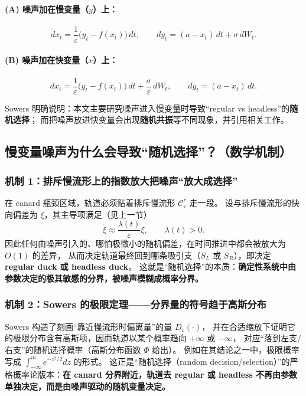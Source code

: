 \documentclass[a4paper,twoside,openany,UTF8]{article}  %
\numberwithin{equation}{section}  %
\numberwithin{equation}{section}  %
\begin{document}
\paragraph{(A) 噪声加在慢变量（$y$）上：}
\begin{equation}\label{eq:slow-noise}
	dx_t=\frac{1}{\varepsilon}\bigl(y_t-f(x_t)\bigr)\,dt,\qquad
	dy_t=(a-x_t)\,dt+\sigma\,dW_t .
\end{equation}

\paragraph{(B) 噪声加在快变量（$x$）上：}
\begin{equation}\label{eq:fast-noise}
	dx_t=\frac{1}{\varepsilon}\bigl(y_t-f(x_t)\bigr)\,dt+\frac{\sigma}{\varepsilon}\,dW_t,\qquad
	dy_t=(a-x_t)\,dt .
\end{equation}

Sowers 明确说明：本文主要研究噪声进入慢变量时导致“regular vs headless”的\textbf{随机选择}；
而把噪声放进快变量会出现\textbf{随机共振}等不同现象，并引用相关工作。%

\subsection{慢变量噪声为什么会导致“随机选择”？（数学机制）}

\subsubsection{机制 1：排斥慢流形上的指数放大把噪声“放大成选择”}
在 canard 瓶颈区域，轨道必须贴着排斥慢流形 $\mathcal C_\varepsilon^{r}$ 走一段。
设与排斥慢流形的快向偏差为 $\xi$，其主导项满足（见上一节）
\[
\dot \xi \approx \frac{\lambda(t)}{\varepsilon}\xi,\qquad \lambda(t)>0.
\]
因此任何由噪声引入的、哪怕极微小的随机偏差，在时间推进中都会被放大为 $O(1)$ 的差异，
从而决定轨道最终回到哪条吸引支（$S_L$ 或 $S_R$），即决定 \textbf{regular duck 或 headless duck}。
这就是“随机选择”的本质：\textbf{确定性系统中由参数决定的极其敏感的分界，被噪声模糊成概率分界。}

\subsubsection{机制 2：Sowers 的极限定理——分界量的符号趋于高斯分布}
Sowers 构造了刻画“靠近慢流形时偏离量”的量 $D_\varepsilon(\cdot)$，
并在合适缩放下证明它的极限分布含有高斯项，因而轨道以某个概率趋向 $+\infty$ 或 $-\infty$，
对应“落到左支/右支”的随机选择概率（高斯分布函数 $\Phi$ 给出）。
例如在其结论之一中，极限概率写成 $\int_{-\infty}^{m} e^{-z^2/2}dz$ 的形式。%
这正是“随机选择（random decision/selection）”的严格概率论版本：\textbf{在 canard 分界附近，轨道去 regular 或 headless 不再由参数单独决定，而是由噪声驱动的随机变量决定。}
\end{document}
